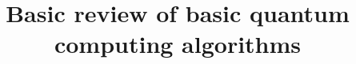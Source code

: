 \documentclass[12pt]{article}
\title{Basic review of basic quantum computing algorithms}
\begin{document}
\maketitle

\newcommand{\qvdots}{%
  \raisebox{0.3em}{\ensuremath{\vdots}}%
}




\newpage







\newpage

\printbibliography
\end{document}

